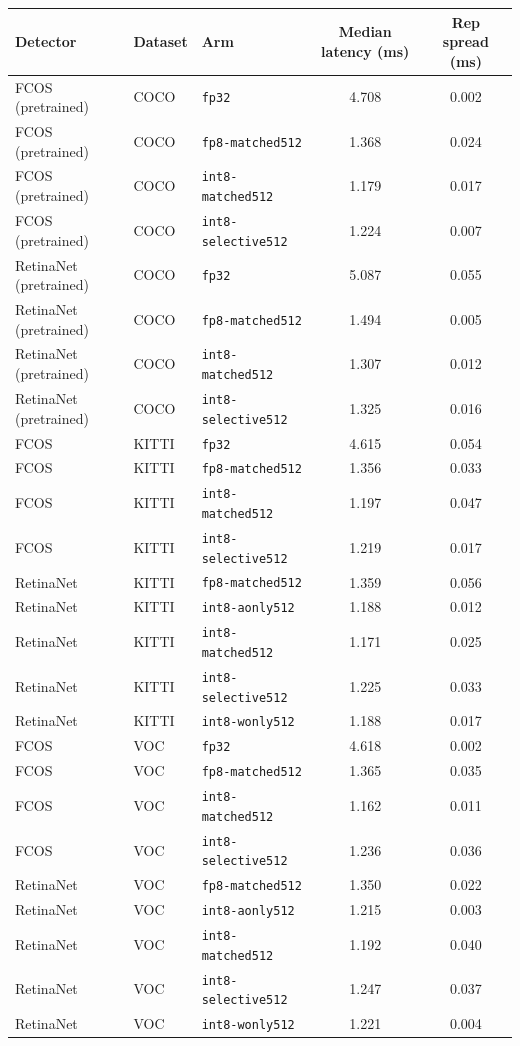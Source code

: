 \begin{tabular}{lllcc}
\toprule
Detector & Dataset & Arm & Median latency (ms) & Rep spread (ms) \\
\midrule
FCOS (pretrained) & COCO & \texttt{fp32} & 4.708 & 0.002 \\
FCOS (pretrained) & COCO & \texttt{fp8-matched512} & 1.368 & 0.024 \\
FCOS (pretrained) & COCO & \texttt{int8-matched512} & 1.179 & 0.017 \\
FCOS (pretrained) & COCO & \texttt{int8-selective512} & 1.224 & 0.007 \\
RetinaNet (pretrained) & COCO & \texttt{fp32} & 5.087 & 0.055 \\
RetinaNet (pretrained) & COCO & \texttt{fp8-matched512} & 1.494 & 0.005 \\
RetinaNet (pretrained) & COCO & \texttt{int8-matched512} & 1.307 & 0.012 \\
RetinaNet (pretrained) & COCO & \texttt{int8-selective512} & 1.325 & 0.016 \\
FCOS & KITTI & \texttt{fp32} & 4.615 & 0.054 \\
FCOS & KITTI & \texttt{fp8-matched512} & 1.356 & 0.033 \\
FCOS & KITTI & \texttt{int8-matched512} & 1.197 & 0.047 \\
FCOS & KITTI & \texttt{int8-selective512} & 1.219 & 0.017 \\
RetinaNet & KITTI & \texttt{fp8-matched512} & 1.359 & 0.056 \\
RetinaNet & KITTI & \texttt{int8-aonly512} & 1.188 & 0.012 \\
RetinaNet & KITTI & \texttt{int8-matched512} & 1.171 & 0.025 \\
RetinaNet & KITTI & \texttt{int8-selective512} & 1.225 & 0.033 \\
RetinaNet & KITTI & \texttt{int8-wonly512} & 1.188 & 0.017 \\
FCOS & VOC & \texttt{fp32} & 4.618 & 0.002 \\
FCOS & VOC & \texttt{fp8-matched512} & 1.365 & 0.035 \\
FCOS & VOC & \texttt{int8-matched512} & 1.162 & 0.011 \\
FCOS & VOC & \texttt{int8-selective512} & 1.236 & 0.036 \\
RetinaNet & VOC & \texttt{fp8-matched512} & 1.350 & 0.022 \\
RetinaNet & VOC & \texttt{int8-aonly512} & 1.215 & 0.003 \\
RetinaNet & VOC & \texttt{int8-matched512} & 1.192 & 0.040 \\
RetinaNet & VOC & \texttt{int8-selective512} & 1.247 & 0.037 \\
RetinaNet & VOC & \texttt{int8-wonly512} & 1.221 & 0.004 \\
\bottomrule
\end{tabular}
